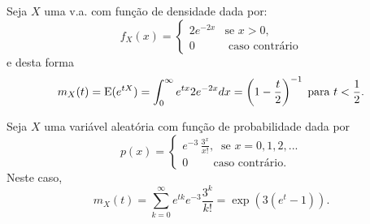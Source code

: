 \begin{frame}
	\begin{exem}
		Seja $X$ uma v.a. com função de densidade dada por:
		\begin{equation*}
		f_{X}(x)=
		\begin{cases}
		2e^{-2x}& \text{se  }x>0, \\
		0 & \text{    caso contrário}%
		\end{cases}
		\end{equation*}
		e desta forma 
		\begin{equation*}
		m_{X}(t)={\rm E}(e^{tX})=\int_{0}^{\infty }e^{tx}2e^{-2x}dx=\left( 1-\frac{t}{2}%
		\right) ^{-1}\;\text{para }t<\frac{1}{2}.
		\end{equation*}
	\end{exem}
	
	
	\begin{exem}
		Seja $X$ uma variável aleatória com função de probabilidade dada por
		\begin{equation*}
		p(x)=\left\{
		\begin{array}{c}
		e^{-3} \, \frac{3^{x}}{x!}, \;\;\text{se\ }x=0,1,2,... \\
		0\;\;\;\;\;\;\;\;\text{caso contrário.}%
		\end{array}%
		\right.
		\end{equation*}
		Neste caso,
		\begin{equation*}
		m_{X}(t)=\sum_{k=0}^{\infty }e^{tk}e^{-3}\frac{3^{k}}{k!}=\exp
		(3(e^{t}-1)).
		\end{equation*}
	\end{exem}
	
\end{frame}


